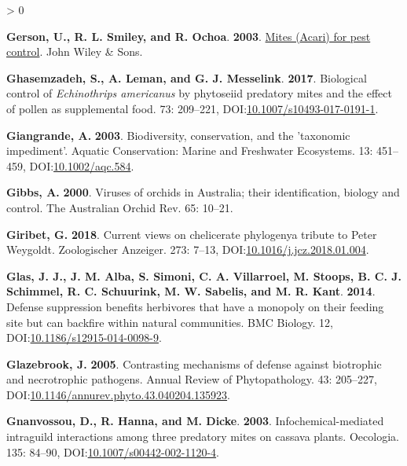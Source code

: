 \documentclass{ufdissertation}[overrideChapters] %
\newlength{\cslhangindent}
\newenvironment{CSLReferences}[2] %
 {%
  \setlength{\parindent}{0pt}
  \ifodd #1 \everypar{\setlength{\hangindent}{\cslhangindent}}\ignorespaces\fi
  \ifnum #2 > 0
  \setlength{\parskip}{#2\baselineskip}
  \fi
 }%
 {}
\begin{document}
{\begin{CSLReferences}{1}{1}
\leavevmode{}%
\textbf{Gerson, U., R. L. Smiley, and R. Ochoa}. \textbf{2003}. \href{https://doi.org/10.1002/9780470750995}{Mites ({Acari}) for pest control}. John Wiley \& Sons.

\leavevmode{}%
\textbf{Ghasemzadeh, S., A. Leman, and G. J. Messelink}. \textbf{2017}. Biological control of {\emph{Echinothrips americanus}} by phytoseiid predatory mites and the effect of pollen as supplemental food. 73: 209--221, DOI:\href{https://doi.org/10.1007/s10493-017-0191-1}{10.1007/s10493-017-0191-1}.

\leavevmode{}%
\textbf{Giangrande, A.} \textbf{2003}. Biodiversity, conservation, and the 'taxonomic impediment'. Aquatic Conservation: Marine and Freshwater Ecosystems. 13: 451--459, DOI:\href{https://doi.org/10.1002/aqc.584}{10.1002/aqc.584}.

\leavevmode{}%
\textbf{Gibbs, A.} \textbf{2000}. Viruses of orchids in {Australia}; their identification, biology and control. The {Australia}n Orchid Rev. 65: 10--21.

\leavevmode{}%
\textbf{Giribet, G.} \textbf{2018}. Current views on chelicerate phylogeny{\textemdash}a tribute to {Peter Weygoldt}. Zoologischer Anzeiger. 273: 7--13, DOI:\href{https://doi.org/10.1016/j.jcz.2018.01.004}{10.1016/j.jcz.2018.01.004}.

\leavevmode{}%
\textbf{Glas, J. J., J. M. Alba, S. Simoni, C. A. Villarroel, M. Stoops, B. C. J. Schimmel, R. C. Schuurink, M. W. Sabelis, and M. R. Kant}. \textbf{2014}. Defense suppression benefits herbivores that have a monopoly on their feeding site but can backfire within natural communities. {BMC} Biology. 12, DOI:\href{https://doi.org/10.1186/s12915-014-0098-9}{10.1186/s12915-014-0098-9}.

\leavevmode{}%
\textbf{Glazebrook, J.} \textbf{2005}. Contrasting mechanisms of defense against biotrophic and necrotrophic pathogens. Annual Review of Phytopathology. 43: 205--227, DOI:\href{https://doi.org/10.1146/annurev.phyto.43.040204.135923}{10.1146/annurev.phyto.43.040204.135923}.

\leavevmode{}%
\textbf{Gnanvossou, D., R. Hanna, and M. Dicke}. \textbf{2003}. Infochemical-mediated intraguild interactions among three predatory mites on cassava plants. Oecologia. 135: 84--90, DOI:\href{https://doi.org/10.1007/s00442-002-1120-4}{10.1007/s00442-002-1120-4}.


\end{CSLReferences}}
\end{document}
